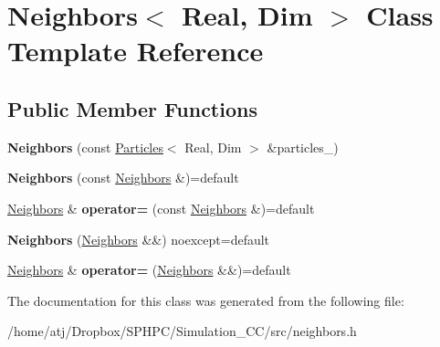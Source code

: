 \hypertarget{classNeighbors}{}\section{Neighbors$<$ Real, Dim $>$ Class Template Reference}
\label{classNeighbors}
\subsection*{Public Member Functions}
\begin{DoxyCompactItemize}
\item 
\hypertarget{classNeighbors_a31d6183be4ac622a2d65f5dba2f4bab1}{}{\bfseries Neighbors} (const \hyperlink{classParticles}{Particles}$<$ Real, Dim $>$ \&particles\+\_\+)\label{classNeighbors_a31d6183be4ac622a2d65f5dba2f4bab1}

\item 
\hypertarget{classNeighbors_a8e7f2ae00cdc9a3796b9d874e01af4ca}{}{\bfseries Neighbors} (const \hyperlink{classNeighbors}{Neighbors} \&)=default\label{classNeighbors_a8e7f2ae00cdc9a3796b9d874e01af4ca}

\item 
\hypertarget{classNeighbors_a764fe7a8dd4fa251980d25152e2428cd}{}\hyperlink{classNeighbors}{Neighbors} \& {\bfseries operator=} (const \hyperlink{classNeighbors}{Neighbors} \&)=default\label{classNeighbors_a764fe7a8dd4fa251980d25152e2428cd}

\item 
\hypertarget{classNeighbors_af9c84e13edbea54ad798eee96822e956}{}{\bfseries Neighbors} (\hyperlink{classNeighbors}{Neighbors} \&\&) noexcept=default\label{classNeighbors_af9c84e13edbea54ad798eee96822e956}

\item 
\hypertarget{classNeighbors_a20dee82d8ad12ca6d88f23cb7fab8722}{}\hyperlink{classNeighbors}{Neighbors} \& {\bfseries operator=} (\hyperlink{classNeighbors}{Neighbors} \&\&)=default\label{classNeighbors_a20dee82d8ad12ca6d88f23cb7fab8722}

\end{DoxyCompactItemize}


The documentation for this class was generated from the following file\+:\begin{DoxyCompactItemize}
\item 
/home/atj/\+Dropbox/\+S\+P\+H\+P\+C/\+Simulation\+\_\+\+C\+C/src/neighbors.\+h\end{DoxyCompactItemize}
